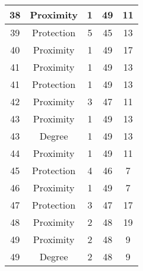 \documentclass[results.tex]{subfiles}
\begin{document}
\begin{center}
\begin{tabular}{| c || c | c | c | c |}
            \hline
            38                      & Proximity                    & 1                      & 49                      & 11                   \\
            \hline
            39                      & Protection                   & 5                      & 45                      & 13                   \\
            \hline
            40                      & Proximity                    & 1                      & 49                      & 17                   \\
            \hline
            41                      & Proximity                    & 1                      & 49                      & 13                   \\
            \hline
            41                      & Protection                   & 1                      & 49                      & 13                   \\
            \hline
            42                      & Proximity                    & 3                      & 47                      & 11                   \\
            \hline
            43                      & Proximity                    & 1                      & 49                      & 13                   \\
            \hline
            43                      & Degree                       & 1                      & 49                      & 13                   \\
            \hline
            44                      & Proximity                    & 1                      & 49                      & 11                   \\
            \hline
            45                      & Protection                   & 4                      & 46                      & 7                    \\
            \hline
            46                      & Proximity                    & 1                      & 49                      & 7                    \\
            \hline
            47                      & Protection                   & 3                      & 47                      & 17                   \\
            \hline
            48                      & Proximity                    & 2                      & 48                      & 19                   \\
            \hline
            49                      & Proximity                    & 2                      & 48                      & 9                    \\
            \hline
            49                      & Degree                       & 2                      & 48                      & 9                    \\
            \hline
        \end{tabular}
    \end{center}
\end{document}

